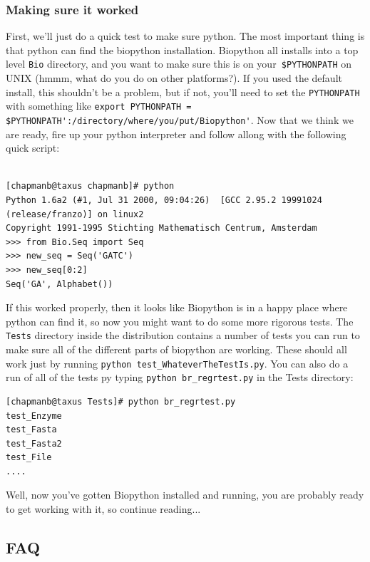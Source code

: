 \documentclass{article}
\begin{document}
\subsubsection{Making sure it worked}

First, we'll just do a quick test to make sure python. The most important thing is that python can find the biopython installation. Biopython all installs into a top level \verb|Bio| directory, and you want to make sure this is on your\verb| $PYTHONPATH| on UNIX (hmmm, what do you do on other platforms?). If you used the default install, this shouldn't be a problem, but if not, you'll need to set the \verb|PYTHONPATH| with something like \verb|export PYTHONPATH = $PYTHONPATH':/directory/where/you/put/Biopython'|. Now that we think we are ready, fire up your python interpreter and follow allong with the following quick script:

\begin{verbatim}

[chapmanb@taxus chapmanb]# python
Python 1.6a2 (#1, Jul 31 2000, 09:04:26)  [GCC 2.95.2 19991024 (release/franzo)] on linux2
Copyright 1991-1995 Stichting Mathematisch Centrum, Amsterdam
>>> from Bio.Seq import Seq
>>> new_seq = Seq('GATC') 
>>> new_seq[0:2]
Seq('GA', Alphabet())

\end{verbatim}

If this worked properly, then it looks like Biopython is in a happy place where python can find it, so now you might want to do some more rigorous tests. The \verb|Tests| directory inside the distribution contains a number of tests you can run to make sure all of the different parts of biopython are working. These should all work just by running \verb|python test_WhateverTheTestIs.py|. You can also do a run of all of the tests py typing \verb|python br_regrtest.py| in the Tests directory:

\begin{verbatim}
[chapmanb@taxus Tests]# python br_regrtest.py
test_Enzyme
test_Fasta
test_Fasta2
test_File
....
\end{verbatim}


Well, now you've gotten Biopython installed and running, you are probably ready to get working with it, so continue reading...

\subsection{FAQ}
\end{document}
